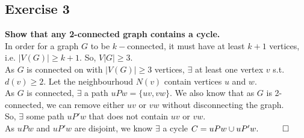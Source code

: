 \subsection*{Exercise 3 }
\textbf{Show that any 2-connected graph contains a cycle.} \\
\linebreak
In order for a graph $G$ to be $k-$connected, it must have at least $k+1$ vertices, i.e. $|V(G)| \geq k+1$. So, $V|G| \geq 3$. \\
\linebreak
As $G$ is connected on with $|V(G)| \geq 3$ vertices, $\exists$ at least one vertex $v$ s.t. $d(v) \geq 2$. Let the neighbourhoud $N(v)$ contain vertices $u$ and $w$. \\
\linebreak 
As $G$ is connected, $\exists$ a path $uPw = \{uv, vw\}$. We also know that as $G$ is 2-connected, we can remove either $uv$ or $vw$ without disconnecting the graph. \\
\linebreak 
So, $\exists$ some path $uP'w$ that does not contain $uv$ or $vw$. \\
\linebreak 
As $uPw$ and $uP'w$ are disjoint, we know $\exists$ a cycle $C = uPw \cup uP'w. \hspace{10mm} \square$